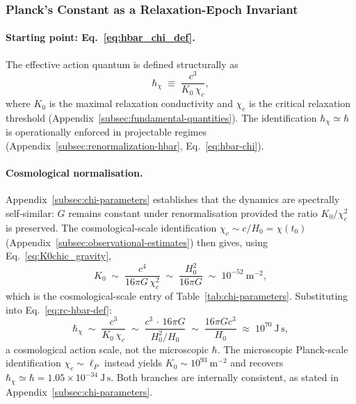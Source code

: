   \subsubsection*{Planck's Constant as a Relaxation-Epoch Invariant}
    \label{sec:relax-cascade-hbar}

    \paragraph[Starting point: Eq. hbar-chi-def]{Starting point: Eq.~\eqref{eq:hbar_chi_def}.}
      The effective action quantum is defined structurally as
    \begin{equation}
      \label{eq:rc-hbar-def}
      \hbar_\chi
      \;\equiv\;
      \frac{c^3}{K_0\,\chi_c},
      \end{equation}
      where $K_0$ is the maximal relaxation conductivity and $\chi_c$ is the
      critical relaxation threshold (Appendix~\ref{subsec:fundamental-quantities}).
      The identification $\hbar_\chi \simeq \hbar$ is operationally enforced
      in projectable regimes (Appendix~\ref{subsec:renormalization-hbar}, Eq.~\eqref{eq:hbar-chi}).

    \paragraph{Cosmological normalisation.}
      Appendix~\ref{subsec:chi-parameters} establishes that the dynamics are spectrally self-similar:
      $G$ remains constant under renormalisation provided the ratio $K_0/\chi_c^2$ is preserved.
      The cosmological-scale identification $\chi_c \sim c/H_0 = \chi(t_0)$
      (Appendix~\ref{subsec:observational-estimates}) then gives, using Eq.~\eqref{eq:K0chic_gravity},
    \begin{equation}
      \label{eq:rc-K0-cosmo}
      K_0 \;\sim\; \frac{c^4}{16\pi G\,\chi_c^2}
      \;\sim\; \frac{H_0^2}{16\pi G}
      \;\sim\; 10^{-52}~\mathrm{m}^{-2},
      \end{equation}
      which is the cosmological-scale entry of Table~\ref{tab:chi-parameters}.
      Substituting into Eq.~\eqref{eq:rc-hbar-def}:
    \begin{equation}
      \label{eq:rc-hbar-cosmo}
      \hbar_\chi
      \;\sim\; \frac{c^3}{K_0\,\chi_c}
      \;\sim\; \frac{c^3\,\cdot\, 16\pi G}{H_0^2/H_0}
      \;\sim\; \frac{16\pi G c^3}{H_0}
      \;\approx\; 10^{70}~\mathrm{J\,s},
      \end{equation}
      a cosmological action scale, not the microscopic $\hbar$.
      The microscopic Planck-scale identification $\chi_c \sim \ell_P$
      instead yields $K_0 \sim 10^{93}~\mathrm{m}^{-2}$ and recovers
      $\hbar_\chi \simeq \hbar = 1.05 \times 10^{-34}~\mathrm{J\,s}$.
      Both branches are internally consistent, as stated in Appendix~\ref{subsec:chi-parameters}.

